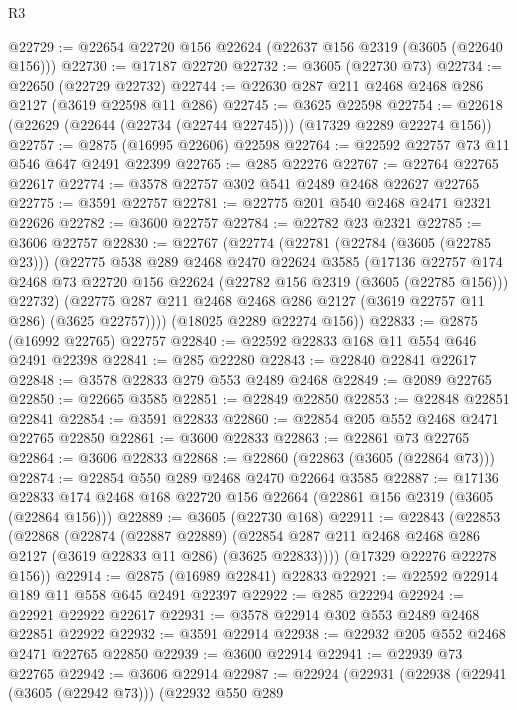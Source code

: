 \begin{lexlean}{R3}
\begin{coremodule}
@22729 := @22654 @22720 @156 @22624 (@22637 @156 @2319 (@3605 (@22640 @156)))
@22730 := @17187 @22720
@22732 := @3605 (@22730 @73)
@22734 := @22650 (@22729 @22732)
@22744 := @22630 @287 @211 @2468 @2468 @286 @2127 (@3619 @22598 @11 @286)
@22745 := @3625 @22598
@22754 := @22618 (@22629 (@22644 (@22734 (@22744 @22745))) (@17329 @2289 @22274 @156))
@22757 := @2875 (@16995 @22606) @22598
@22764 := @22592 @22757 @73 @11 @546 @647 @2491 @22399
@22765 := @285 @22276
@22767 := @22764 @22765 @22617
@22774 := @3578 @22757 @302 @541 @2489 @2468 @22627 @22765
@22775 := @3591 @22757
@22781 := @22775 @201 @540 @2468 @2471 @2321 @22626
@22782 := @3600 @22757
@22784 := @22782 @23 @2321
@22785 := @3606 @22757
@22830 := @22767
    (@22774
      (@22781
        (@22784 (@3605 (@22785 @23)))
        (@22775
          @538
          @289
          @2468
          @2470
          @22624
          @3585
          (@17136
            @22757
            @174
            @2468
            @73
            @22720
            @156
            @22624
            (@22782 @156 @2319 (@3605 (@22785 @156)))
            @22732)
          (@22775 @287 @211 @2468 @2468 @286 @2127 (@3619 @22757 @11 @286) (@3625 @22757))))
      (@18025 @2289 @22274 @156))
@22833 := @2875 (@16992 @22765) @22757
@22840 := @22592 @22833 @168 @11 @554 @646 @2491 @22398
@22841 := @285 @22280
@22843 := @22840 @22841 @22617
@22848 := @3578 @22833 @279 @553 @2489 @2468
@22849 := @2089 @22765
@22850 := @22665 @3585
@22851 := @22849 @22850
@22853 := @22848 @22851 @22841
@22854 := @3591 @22833
@22860 := @22854 @205 @552 @2468 @2471 @22765 @22850
@22861 := @3600 @22833
@22863 := @22861 @73 @22765
@22864 := @3606 @22833
@22868 := @22860 (@22863 (@3605 (@22864 @73)))
@22874 := @22854 @550 @289 @2468 @2470 @22664 @3585
@22887 := @17136 @22833 @174 @2468 @168 @22720 @156 @22664 (@22861 @156 @2319 (@3605 (@22864 @156)))
@22889 := @3605 (@22730 @168)
@22911 := @22843
    (@22853
      (@22868
        (@22874
          (@22887 @22889)
          (@22854 @287 @211 @2468 @2468 @286 @2127 (@3619 @22833 @11 @286) (@3625 @22833))))
      (@17329 @22276 @22278 @156))
@22914 := @2875 (@16989 @22841) @22833
@22921 := @22592 @22914 @189 @11 @558 @645 @2491 @22397
@22922 := @285 @22294
@22924 := @22921 @22922 @22617
@22931 := @3578 @22914 @302 @553 @2489 @2468 @22851 @22922
@22932 := @3591 @22914
@22938 := @22932 @205 @552 @2468 @2471 @22765 @22850
@22939 := @3600 @22914
@22941 := @22939 @73 @22765
@22942 := @3606 @22914
@22987 := @22924
    (@22931
      (@22938
        (@22941 (@3605 (@22942 @73)))
        (@22932
          @550
          @289

\end{coremodule}
\end{lexlean}
